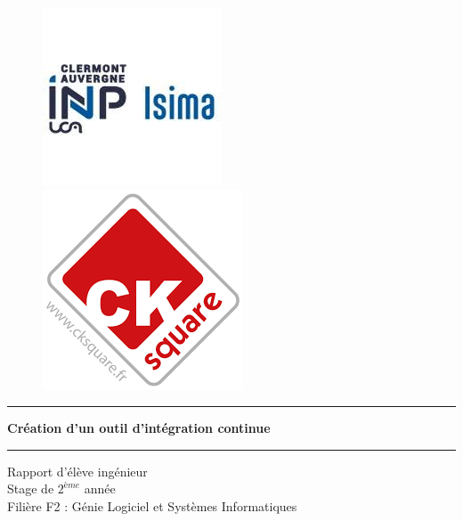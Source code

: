 \begin{titlepage}
  \hspace{\fill}
  \begin{figure}[!htb]
     \begin{minipage}{0.50\textwidth}
       \centering
       \includegraphics[scale=0.8]{./img/logo_isima_inp.jpeg}
     \end{minipage}\hfill
     \begin{minipage}{0.50\textwidth}
       \centering
       \includegraphics[scale=0.4]{./img/logo-ck.png}%
     \end{minipage}
  \end{figure}
  \begin{center}
    \vspace*{1cm}

    \par\noindent\rule{\textwidth}{0.5pt}
    \Huge
    \textbf{Création d'un outil d'intégration continue}
    \par\noindent\rule{\textwidth}{0.5pt}

    \vspace{0.2cm}
    \LARGE
    Rapport d'élève ingénieur\\
    Stage de $2^{ème}$ année\\
    Filière F2 : Génie Logiciel et Systèmes Informatiques

    \vspace{1.5cm}


\end{center}
\end{titlepage}
